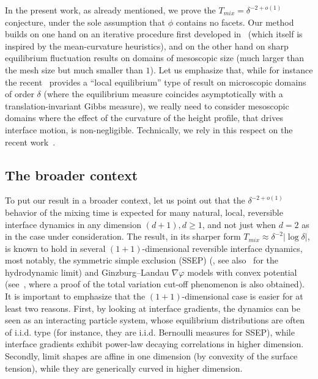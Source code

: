 \documentclass[AHL,Unicode,longabstracts,published]{cedram}
\begin{document}
In the present work, as already mentioned, we prove the $T_{mix}=\delta^{-2+o(1)}$ conjecture, under the sole assumption that $\phi$ contains no facets. Our method builds on one hand on an iterative procedure first developed in~\cite{CMT} (which itself is inspired by the mean-curvature heuristics), and on the other hand on sharp equilibrium fluctuation results on domains of mesoscopic size (much larger than the mesh size but much smaller than $1$). Let us emphasize that, while for instance the recent~\cite{Aggarwal} provides a ``local equilibrium'' type of result on microscopic domains of order $\delta$ (where the equilibrium measure coincides asymptotically with a translation-invariant Gibbs measure), we really need to consider mesoscopic domains where the effect of the curvature of the height profile, that drives interface motion, is non-negligible. Technically, we rely in this respect on the recent work~\cite{L_arxiv}.

\subsection{The broader context}

To put our result in a broader context, let us point out that the $\delta^{-2+o(1)}$ behavior of the mixing time is expected for many natural, local, reversible interface dynamics in any dimension $(d+1),d\ge1$, and not just when $d=2$ as in the case under consideration. The result, in its sharper form $T_{mix}\approx \delta^{-2}|\log \delta|$, is known to hold in several $(1+1)$-dimensional reversible interface dynamics, most notably, the symmetric simple exclusion (SSEP) (\cite{Lacoin,Wilson}, see also~\cite{KL} for the hydrodynamic limit) and Ginzburg--Landau $\nabla\varphi$ models with convex potential (see~\cite{CLL}, where a proof of the total variation cut-off phenomenon is also obtained). It is important to emphasize that the $(1+1)$-dimensional case is easier for at least two reasons. First, by looking at interface gradients, the dynamics can be seen as an interacting particle system, whose equilibrium distributions are often of i.i.d. type (for instance, they are i.i.d. Bernoulli measures for SSEP), while interface gradients exhibit power-law decaying correlations in higher dimension. Secondly, limit shapes are affine in one dimension (by convexity of the surface tension), while they are generically curved in higher dimension.
\end{document}
